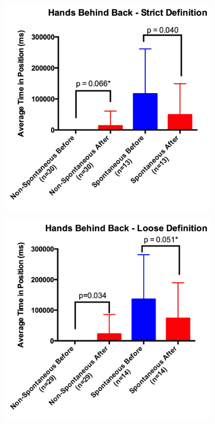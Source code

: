 \documentclass{acm_proc_article-sp}
\begin{document}
\begin{figure}[t!]
\centering
 \includegraphics[width=0.65\linewidth]{bstrict.jpg}\\
 \label{bstrict} %
\end{figure}

\begin{figure}[t!]
\centering
 \includegraphics[width=0.65\linewidth]{bloose.jpg}\\
 \label{bloose} %
\end{figure}
\end{document}
